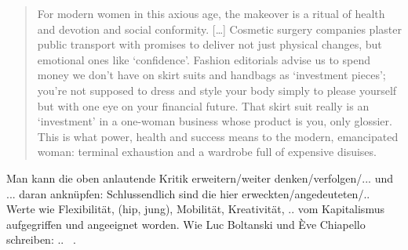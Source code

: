 \begin{quote}
For modern women in this axious age, the makeover is a ritual of health and devotion and social conformity.
[\ldots]
Cosmetic surgery companies plaster public transport with promises to deliver not just physical changes, but emotional ones like `confidence'.
Fashion editorials advise us to spend money we don't have on skirt suits and handbags as `investment pieces'; you're not supposed to dress and style your body simply to please yourself but with one eye on your financial future.
That skirt suit really is an `investment' in a one-woman business whose product is you, only glossier.
This is what power, health and success means to the modern, emancipated woman: terminal exhaustion and a wardrobe full of expensive disuises.~\cite[p.41-42]{Penny14}
\end{quote}

Man kann die oben anlautende Kritik erweitern/weiter denken/verfolgen/... und ... daran anknüpfen:
Schlussendlich sind die hier erweckten/angedeuteten/.. Werte wie Flexibilität, (hip, jung), Mobilität, Kreativität, .. vom Kapitalismus aufgegriffen und angeeignet worden.
Wie Luc Boltanski und Ève Chiapello schreiben: .. ~\cite[]{BolChi07}.

